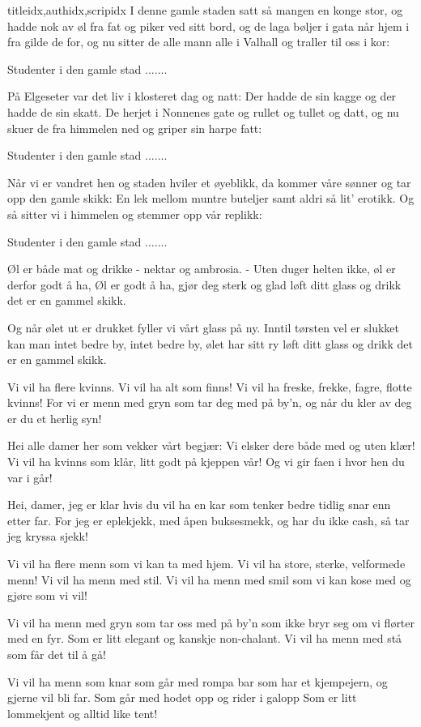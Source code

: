 \documentclass[14pt,letterpaper,norsk]{article}
\begin{document}
\begin{songs}{titleidx,authidx,scripidx}
\beginverse
I denne gamle staden satt så mangen en konge stor,
og hadde nok av øl fra fat og piker ved sitt bord,
og de laga bøljer i gata når hjem i fra gilde de for,
og nu sitter de alle mann alle i Valhall og traller til oss i kor:
\endverse

\beginchorus
Studenter i den gamle stad .......
\endchorus

\beginverse
På Elgeseter var det liv i klosteret dag og natt:
Der hadde de sin kagge og der hadde de sin skatt.
De herjet i Nonnenes gate og rullet og tullet og datt,
og nu skuer de fra himmelen ned og griper sin harpe fatt:
\endverse

\beginchorus
Studenter i den gamle stad .......
\endchorus

\beginverse
Når vi er vandret hen og staden hviler et øyeblikk,
da kommer våre sønner og tar opp den gamle skikk:
En lek mellom muntre buteljer samt aldri så lit' erotikk.
Og så sitter vi i himmelen og stemmer opp vår replikk:
\endverse

\beginchorus
Studenter i den gamle stad .......
\endchorus
\endsong

\beginverse
Øl er både mat og drikke - nektar og ambrosia. -
Uten duger helten ikke, øl er derfor godt å ha,
Øl er godt å ha, gjør deg sterk og glad
løft ditt glass og drikk det er en gammel skikk.
\endverse

\beginverse
Og når ølet ut er drukket fyller vi vårt glass på ny.
Inntil tørsten vel er slukket kan man intet bedre by,
intet bedre by, ølet har sitt ry
løft ditt glass og drikk det er en gammel skikk.
\endverse
\endsong

\beginverse
Vi vil ha flere kvinns. 
Vi vil ha alt som finns! 
Vi vil ha freske, frekke, fagre, flotte kvinns! 
For vi er menn med gryn 
som tar deg med på by'n, 
og når du kler av deg 
er du et herlig syn! 
\endverse

\beginverse
Hei alle damer her 
som vekker vårt begjær: 
Vi elsker dere både med og uten klær! 
Vi vil ha kvinns som klår, 
litt godt på kjeppen vår! 
Og vi gir faen i hvor hen du var i går! 
\endverse

\beginverse
Hei, damer, jeg er klar 
hvis du vil ha en kar 
som tenker bedre tidlig snar enn etter far. 
For jeg er eplekjekk, 
med åpen buksesmekk, 
og har du ikke cash, 
så tar jeg kryssa sjekk! 
\endverse
\endsong

\beginverse
Vi vil ha flere menn
som vi kan ta med hjem.
Vi vil ha store, sterke, velformede menn!
Vi vil ha menn med stil.
Vi vil ha menn med smil
som vi kan kose med og gjøre som vi vil!
\endverse

\beginverse
Vi vil ha menn med gryn
som tar oss med på by'n
som ikke bryr seg om vi flørter med en fyr.
Som er litt elegant
og kanskje non-chalant.
Vi vil ha menn med stå som får det til å gå!
\endverse

\beginverse
Vi vil ha menn som knar
som går med rompa bar
som har et kjempejern, og gjerne vil bli far.
Som går med hodet opp
og rider i galopp
Som er litt lommekjent og alltid like tent!
\endverse
\endsong

\end{songs}
\end{document}

